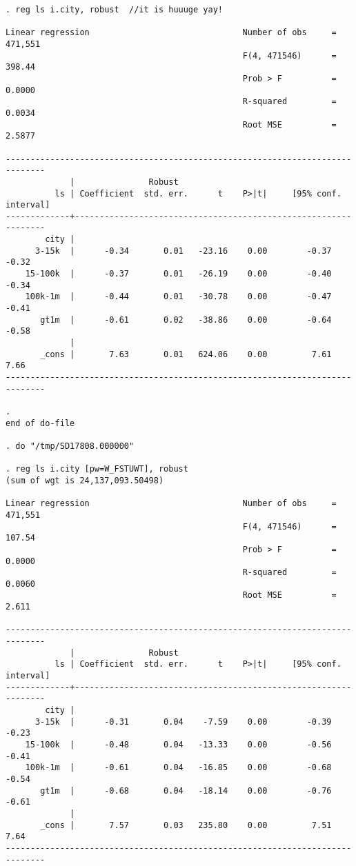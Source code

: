 \documentclass[10pt, letterpaper]{article}
\begin{document}
\begin{spacing}{1.4}
\begin{spacing}{.5}
\begin{scriptsize}
\begin{verbatim}
. reg ls i.city, robust  //it is huuuge yay!

Linear regression                               Number of obs     =    471,551
                                                F(4, 471546)      =     398.44
                                                Prob > F          =     0.0000
                                                R-squared         =     0.0034
                                                Root MSE          =     2.5877

------------------------------------------------------------------------------
             |               Robust
          ls | Coefficient  std. err.      t    P>|t|     [95% conf. interval]
-------------+----------------------------------------------------------------
        city |
      3-15k  |      -0.34       0.01   -23.16    0.00        -0.37       -0.32
    15-100k  |      -0.37       0.01   -26.19    0.00        -0.40       -0.34
    100k-1m  |      -0.44       0.01   -30.78    0.00        -0.47       -0.41
       gt1m  |      -0.61       0.02   -38.86    0.00        -0.64       -0.58
             |
       _cons |       7.63       0.01   624.06    0.00         7.61        7.66
------------------------------------------------------------------------------

. 
end of do-file

. do "/tmp/SD17808.000000"

. reg ls i.city [pw=W_FSTUWT], robust 
(sum of wgt is 24,137,093.50498)

Linear regression                               Number of obs     =    471,551
                                                F(4, 471546)      =     107.54
                                                Prob > F          =     0.0000
                                                R-squared         =     0.0060
                                                Root MSE          =      2.611

------------------------------------------------------------------------------
             |               Robust
          ls | Coefficient  std. err.      t    P>|t|     [95% conf. interval]
-------------+----------------------------------------------------------------
        city |
      3-15k  |      -0.31       0.04    -7.59    0.00        -0.39       -0.23
    15-100k  |      -0.48       0.04   -13.33    0.00        -0.56       -0.41
    100k-1m  |      -0.61       0.04   -16.85    0.00        -0.68       -0.54
       gt1m  |      -0.68       0.04   -18.14    0.00        -0.76       -0.61
             |
       _cons |       7.57       0.03   235.80    0.00         7.51        7.64
------------------------------------------------------------------------------


\end{verbatim}
\end{scriptsize}
\end{spacing}
\end{spacing}
\end{document}
